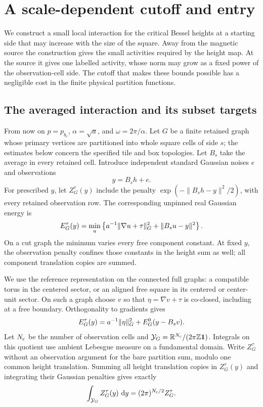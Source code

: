 \section{A scale-dependent cutoff and entry}\label{sec:entry}

We construct a small local interaction for the critical Bessel heights
at a starting side that may increase with the size of the square.
Away from the magnetic source the construction gives the small
activities required by the height map.  At the source it gives one
labelled activity, whose norm may grow as a fixed power of the
observation-cell side.  The cutoff that makes these bounds possible
has a negligible cost in the finite physical partition functions.

\subsection{The averaged interaction and its subset targets}

From now on \(p=p_{b_c}\), \(\alpha=\sqrt a\), and
\(\omega=2\pi/\alpha\).  Let \(G\) be a finite retained graph whose
primary vertices are partitioned into whole square cells of side \(s\);
the estimates below concern the specified tile and box topologies.
Let \(B_s\) take the average in every retained cell.  Introduce
independent standard Gaussian noises \(e\) and observations
\[
                         y=B_sh+e.
\]
For prescribed \(y\), let \(Z_G^\tau(y)\) include the penalty
\(\exp(-\|B_sh-y\|^2/2)\), with every retained observation row.
The corresponding unpinned real Gaussian energy is
\begin{equation}\label{eq:observation-energy}
 E_G^\tau(y)=\min_u
 \left\{a^{-1}\lVert \nabla u+\tau\rVert_G^2+\lVert B_su-y\rVert^2\right\}.
\end{equation}
On a cut graph the minimum varies every free component constant.
At fixed \(y\), the observation penalty confines those constants in
the height sum as well; all component translation copies are summed.

We use the reference representation on the connected full graphs:
a compatible torus in the centered sector, or an aligned free square
in its centered or center-unit sector.  On such a graph choose \(v\)
so that \(\eta=\nabla v+\tau\) is co-closed, including at a free
boundary.  Orthogonality to gradients gives
\begin{equation}\label{eq:sector-completion}
 E_G^\tau(y)=a^{-1}\lVert \eta\rVert_G^2+E_G^0(y-B_sv).
\end{equation}
Let \(N_{\rm c}\) be the number of observation cells and
\(\mathcal Y_G=\mathbb R^{N_{\rm c}}/(2\pi\mathbb Z\mathbf1)\).  Integrals on
this quotient use ambient Lebesgue measure on a fundamental domain.
Write \(Z_G^\tau\) without an observation argument for the bare
partition sum, modulo one common height translation.  Summing all
height translation copies in \(Z_G^\tau(y)\) and integrating their
Gaussian penalties gives exactly
\[
       \int_{\mathcal Y_G}Z_G^\tau(y)\,\,\mathrm d y
               =(2\pi)^{N_{\rm c}/2}Z_G^\tau .
\]

